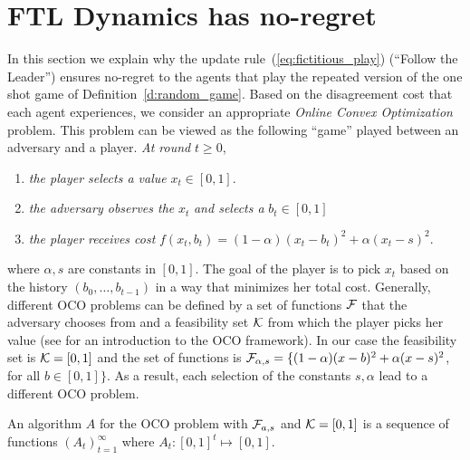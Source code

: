 \section{FTL Dynamics has no-regret}\label{s:fictitious_noregret}
In this section we explain why the
update rule~(\ref{eq:fictitious_play}) (\enquote{Follow the Leader}) ensures
no-regret to the agents that play the repeated version of the one shot
game of Definition~\ref{d:random_game}.
Based on the disagreement cost that each agent experiences,
we consider an appropriate \emph{Online Convex Optimization} problem.
This problem can be viewed as the following \enquote{game} played between an
adversary and a player. \emph{At round }$t\geq 0$,
\begin{enumerate}
  \item \emph{the player selects a value }$x_t \in [0,1]$.
  \item \emph{the adversary observes the }$x_t$ \emph{and selects a} $b_t \in [0,1]$
  \item \emph{the player receives cost} $f(x_t,b_t)=(1-\alpha)(x_t-b_t)^2 + \alpha(x_t -s)^2$.
\end{enumerate}
where $\alpha,s$ are constants in $[0,1]$. The goal of
the player is to pick $x_t$ based on the history
$(b_0,\ldots,b_{t-1})$ in a way that minimizes her total cost.
Generally, different OCO problems can be defined by a set of functions
$\mathcal{F}$ that the adversary chooses from and a feasibility
set $\mathcal{K}$ from which the player picks her value (see \cite{Haz16}
for an introduction to the OCO framework).
In our case the feasibility set is $\mathcal{K}=[0,1]$ and the set of functions
is $\mathcal{F}_{\alpha,s} = \{(1-\alpha)(x-b)^2 + \alpha(x -s)^2$, for all
$b \in [0,1]\}$.
As a result, each selection of the
constants $s,\alpha$ lead to a different OCO problem.

\begin{definition}\label{d:OCO_algo}
An algorithm $A$ for the OCO problem with $\mathcal{F}_{a,s}$ and
$\mathcal{K}=[0,1]$ is a sequence of functions $(A_t)_{t=1}^\infty$ where $A_t:[0,1]^t \mapsto [0,1]$.
\end{definition}

